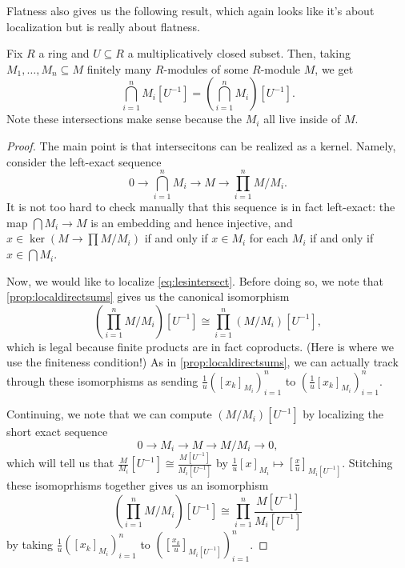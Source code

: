 Flatness also gives us the following result, which again looks like it's about localization but is really about flatness.
\begin{corollary} \label{lem:localizeintersection}
	Fix $R$ a ring and $U\subseteq R$ a multiplicatively closed subset. Then, taking $M_1,\ldots,M_n\subseteq M$ finitely many $R$-modules of some $R$-module $M$, we get
	\[\bigcap_{i=1}^nM_i\left[U^{-1}\right]=\left(\bigcap_{i=1}^nM_i\right)\left[U^{-1}\right].\]
	Note these intersections make sense because the $M_i$ all live inside of $M$.
\end{corollary}
\begin{proof}
	The main point is that intersecitons can be realized as a kernel. Namely, consider the left-exact sequence
	\[0\to\bigcap_{i=1}^nM_i\to M\to\prod_{i=1}^nM/M_i.\tag{$*$}\label{eq:lesintersect}\]
	It is not too hard to check manually that this sequence is in fact left-exact: the map $\bigcap M_i\to M$ is an embedding and hence injective, and $x\in\ker\left(M\to\prod M/M_i\right)$ if and only if $x\in M_i$ for each $M_i$ if and only if $x\in\bigcap M_i$.
	
	Now, we would like to localize \autoref{eq:lesintersect}. Before doing so, we note that \autoref{prop:localdirectsums} gives us the canonical isomorphism
	\[\left(\prod_{i=1}^nM/M_i\right)[U^{-1}]\cong\prod_{i=1}^n(M/M_i)\left[U^{-1}\right],\]
	which is legal because finite products are in fact coproducts. (Here is where we use the finiteness condition!) As in \autoref{prop:localdirectsums}, we can actually track through these isomorphisms as sending $\frac1u([x_k]_{M_i})_{i=1}^n$ to $\left(\frac1u[x_k]_{M_i}\right)_{i=1}^n$.
	
	Continuing, we note that we can compute $(M/M_i)\left[U^{-1}\right]$ by localizing the short exact sequence
	\[0\to M_i\to M\to M/M_i\to 0,\]
	which will tell us that $\frac M{M_i}\left[U^{-1}\right]\cong\frac{M\left[U^{-1}\right]}{M_i\left[U^{-1}\right]}$ by $\frac1u[x]_{M_i}\mapsto\left[\frac xu\right]_{M_i\left[U^{-1}\right]}$. Stitching these isomoprhisms together gives us an isomorphism
	\[\left(\prod_{i=1}^nM/M_i\right)[U^{-1}]\cong\prod_{i=1}^n\frac{M\left[U^{-1}\right]}{M_i\left[U^{-1}\right]}\]
	by taking $\frac1u\left([x_k]_{M_i}\right)_{i=1}^n$ to $\left([\frac{x_k}u]_{M_i\left[U^{-1}\right]}\right)_{i=1}^n$.


\end{proof}
